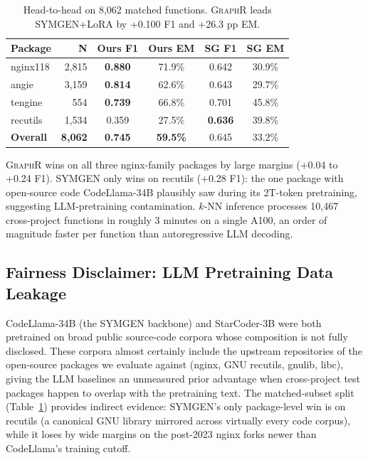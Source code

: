 \documentclass[sigconf,nonacm]{acmart}
\newcommand{\sysname}{\textsc{GraphR}}
\begin{document}
\begin{table}[t]
    \centering
    \caption{Head-to-head on 8{,}062 matched functions. \sysname{} leads SYMGEN+LoRA by +0.100 F1 and +26.3 pp EM.}
    \label{tab:matched}
    \footnotesize
    \begin{tabular}{lrcccc}
        \toprule
        \textbf{Package} & \textbf{N} & \textbf{Ours F1} & \textbf{Ours EM} & \textbf{SG F1} & \textbf{SG EM} \\
        \midrule
        nginx118 & 2{,}815 & \textbf{0.880} & 71.9\% & 0.642 & 30.9\% \\
        angie    & 3{,}159 & \textbf{0.814} & 62.6\% & 0.643 & 29.7\% \\
        tengine  &    554 & \textbf{0.739} & 66.8\% & 0.701 & 45.8\% \\
        recutils & 1{,}534 & 0.359 & 27.5\% & \textbf{0.636} & 39.8\% \\
        \midrule
        \textbf{Overall} & \textbf{8{,}062} & \textbf{0.745} & \textbf{59.5\%} & 0.645 & 33.2\% \\
        \bottomrule
    \end{tabular}
\end{table}

\sysname{} wins on all three nginx-family packages by large margins (+0.04 to +0.24 F1). SYMGEN only wins on recutils (+0.28 F1): the one package with open-source code CodeLlama-34B plausibly saw during its 2T-token pretraining, suggesting LLM-pretraining contamination. $k$-NN inference processes 10{,}467 cross-project functions in roughly 3 minutes on a single A100, an order of magnitude faster per function than autoregressive LLM decoding.

\subsection{Fairness Disclaimer: LLM Pretraining Data Leakage}
\label{sec:fairness}

CodeLlama-34B (the SYMGEN backbone) and StarCoder-3B were both pretrained on broad public source-code corpora whose composition is not fully disclosed. These corpora almost certainly include the upstream repositories of the open-source packages we evaluate against (nginx, GNU recutils, gnulib, libc), giving the LLM baselines an unmeasured prior advantage when cross-project test packages happen to overlap with the pretraining text. The matched-subset split (Table~\ref{tab:matched}) provides indirect evidence: SYMGEN's only package-level win is on recutils (a canonical GNU library mirrored across virtually every code corpus), while it loses by wide margins on the post-2023 nginx forks newer than CodeLlama's training cutoff.
\end{document}
